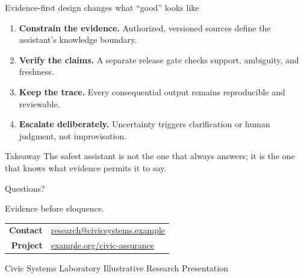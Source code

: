 \begin{frame}{Evidence-first design changes what ``good'' looks like}
  \begin{enumerate}
    \item \textbf{Constrain the evidence.} Authorized, versioned sources define the assistant's knowledge boundary.
    \item \textbf{Verify the claims.} A separate release gate checks support, ambiguity, and freshness.
    \item \textbf{Keep the trace.} Every consequential output remains reproducible and reviewable.
    \item \textbf{Escalate deliberately.} Uncertainty triggers clarification or human judgment, not improvisation.
  \end{enumerate}

  \vfill
  \begin{exampleblock}{Takeaway}
    The safest assistant is not the one that always answers; it is the one that knows what evidence permits it to say.
  \end{exampleblock}
\end{frame}

\begin{frame}[plain]
  \centering
  \vspace{0.55cm}
  {\color{ArborNavy}Questions?}

  \vspace{0.55cm}
  {\Large Evidence before eloquence.}

  \vspace{0.85cm}
  \begin{tabular}{rl}
    \textbf{Contact} & \href{mailto:research@civicsystems.example}{research@civicsystems.example} \\
    \textbf{Project} & \href{https://example.org/civic-assurance}{example.org/civic-assurance}
  \end{tabular}

  \vfill
  {\small Civic Systems Laboratory \textbullet{} Illustrative Research Presentation}
\end{frame}
